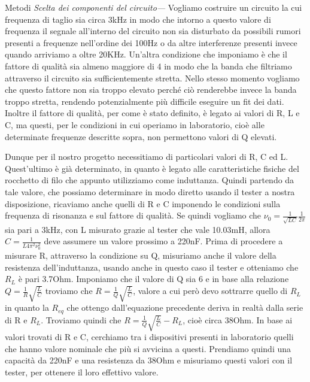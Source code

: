 \documentclass[
    rmp,
    floatfix,
    reprint, 
    superscriptaddress, 
    altaffilletter, 
    amsmath, 
    amssymb, 
    a4paper]{revtex4-2}
\begin{document}
\begin{methods}{Metodi}
    \noindent\textit{Scelta dei componenti del circuito---}\label{par:caratterizzazioneRLC} Vogliamo costruire un circuito la cui frequenza di taglio sia circa 3kHz in modo che intorno a questo valore di frequenza il segnale all'interno del circuito non sia disturbato da possibili rumori presenti a frequenze nell'ordine dei 100Hz o da altre interferenze presenti invece quando arriviamo a oltre 20KHz. Un'altra condizione che imponiamo è che il fattore di qualità sia almeno maggiore di 4 in modo che la banda che filtriamo attraverso il circuito sia sufficientemente stretta. Nello stesso momento vogliamo che questo fattore non sia troppo elevato perch\'e ci\`o renderebbe invece la banda troppo stretta, rendendo potenzialmente più difficile eseguire un fit dei dati. Inoltre il fattore di qualità, per come è stato definito, è legato ai valori di R, L e C, ma questi, per le condizioni in cui operiamo in laboratorio, cioè alle determinate frequenze descritte sopra, non permettono valori di Q elevati. 
    
    Dunque per il nostro progetto necessitiamo di particolari valori di R, C ed L. Quest'ultimo è già determinato, in quanto è legato alle caratteristiche fisiche del rocchetto di filo che appunto utilizziamo come induttanza. Quindi partendo da tale valore, che possiamo determinare in modo diretto usando il tester a nostra disposizione, ricaviamo anche quelli di R e C imponendo le condizioni sulla frequenza di risonanza e sul fattore di qualità. Se quindi vogliamo che $\nu_{0}=\frac{1}{\sqrt{LC}}\frac{1}{2\pi}$ sia pari a 3kHz, con L misurato grazie al tester che vale 10.03mH, allora $C=\frac{1}{L4\pi^2\nu_{0}^2}$ deve assumere un valore prossimo a 220nF. Prima di procedere a misurare R, attraverso la condizione su Q, misuriamo anche il valore della resistenza dell'induttanza, usando anche in questo caso il tester e otteniamo che $R_{L}$ è pari 3.7Ohm. Imponiamo che il valore di Q sia 6 e in base alla relazione $Q=\frac{1}{R}\sqrt{\frac{L}{C}}$ troviamo che $R=\frac{1}{Q}\sqrt{\frac{L}{C}}$, valore a cui però devo sottrarre quello di $R_{L}$ in quanto la $R_{eq}$ che ottengo dall'equazione precedente deriva in realtà dalla serie di R e $R_{L}$. Troviamo quindi che $R=\frac{1}{Q}\sqrt{\frac{L}{C}}-R_{L}$, cioè circa 38Ohm. In base ai valori trovati di R e C, cerchiamo tra i dispositivi presenti in laboratorio quelli che hanno valore nominale che più si avvicina a questi. Prendiamo quindi una capacità da 220nF e una resistenza da 38Ohm e misuriamo questi valori con il tester, per ottenere il loro effettivo valore. 
    

\end{methods}
\end{document}
